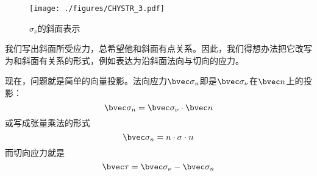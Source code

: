 \begin{figure}[ht]
\centering
\texttt{[image: ./figures/CHYSTR\_3.pdf]}
\caption{$\sigma_\nu$的斜面表示} \label{CHYSTR_fig3}
\end{figure}
我们写出斜面所受应力，总希望他和斜面有点关系。因此，我们得想办法把它改写为和斜面有关系的形式，例如表达为沿斜面法向与切向的应力。

现在，问题就是简单的向量投影。法向应力$\bvec \sigma_n$即是$\bvec \sigma_\nu$在$\bvec n$上的投影：
$$\bvec \sigma_n = \bvec \sigma_\nu \cdot \bvec n $$
或写成张量乘法的形式
$$\bvec \sigma_n = n \cdot \sigma \cdot n $$
而切向应力就是
$$\bvec \tau = \bvec \sigma_\nu - \bvec \sigma_n$$
